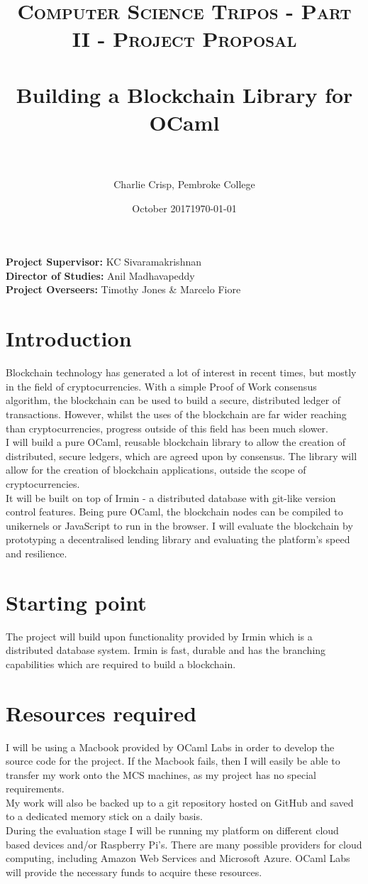 \documentclass[12pt, letterpaper, twoside]{article}
\author{Charlie Crisp, Pembroke College }
\date{October 2017}
\title{	
	\normalfont \normalsize 
	\textsc{Computer Science Tripos - Part II - Project Proposal} \\ [25pt]
	\horrule{0.5pt} \\[0.4cm] %
	\huge Building a Blockchain Library for OCaml\\ %
	\horrule{2pt} \\[0.5cm] %
}
\date{\normalsize\today} %
\begin{document}
	
	\maketitle
	
	\noindent \textbf{Project Supervisor:} KC Sivaramakrishnan \\
	\textbf{Director of Studies:} Anil Madhavapeddy \\
	\textbf{Project Overseers:} Timothy Jones \& Marcelo Fiore\\
	
	\section*{Introduction}
	
	Blockchain technology has generated a lot of interest in recent times, but mostly in the field of cryptocurrencies.
	With a simple Proof of Work consensus algorithm, the blockchain can be used to build a secure, distributed ledger of transactions. However, whilst the uses of the blockchain are far wider reaching than cryptocurrencies, progress outside of this field has been much slower. \\
	I will build a pure OCaml, reusable blockchain library to allow the creation of distributed, secure ledgers, which are agreed upon by consensus. The library will allow for the creation of blockchain applications, outside the scope of cryptocurrencies. \\
	It will be built on top of Irmin \cite{Irmin} - a distributed database with git-like version control features. Being pure OCaml, the blockchain nodes can be compiled to unikernels or JavaScript to run in the browser. I will evaluate the blockchain by prototyping a decentralised lending library and evaluating the platform’s speed and resilience.
	\section*{Starting point}
	The project will build upon functionality provided by Irmin \cite{Irmin} which is a distributed database system. 
	Irmin is fast, durable and has the branching capabilities which are required to build a blockchain.

	\section*{Resources required}
	I will be using a Macbook provided by OCaml Labs \cite{OCaml Labs} in order to develop the source code for the project. If the Macbook fails, then I will easily be able to transfer my work onto the MCS machines, as my project has no special requirements. \\
	My work will also be backed up to a git repository hosted on GitHub and saved to a dedicated memory stick on a daily basis. \\
	During the evaluation stage I will be running my platform on different cloud based devices and/or Raspberry Pi's. There are many possible providers for cloud computing, including Amazon Web Services and Microsoft Azure. OCaml Labs \cite{OCaml Labs} will provide the necessary funds to acquire these resources.
	
\end{document}
